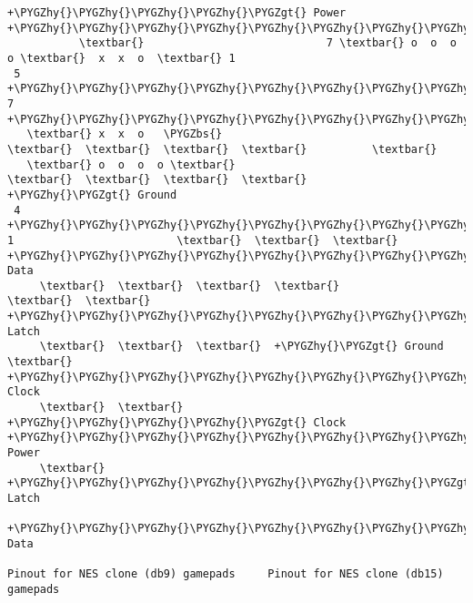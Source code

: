 \documentclass[a4paper,8pt,english]{sphinxmanual}
\def\PYGZbs{\char`\\}
\def\PYGZgt{\char`\>}
\def\PYGZhy{\char`\-}
\begin{document}
\begin{Verbatim}[commandchars=\\\{\}]
           +\PYGZhy{}\PYGZhy{}\PYGZhy{}\PYGZhy{}\PYGZgt{} Power                   +\PYGZhy{}\PYGZhy{}\PYGZhy{}\PYGZhy{}\PYGZhy{}\PYGZhy{}\PYGZhy{}\PYGZhy{}\PYGZhy{}\PYGZhy{}\PYGZhy{}\PYGZhy{}\PYGZhy{}\PYGZhy{}\PYGZhy{}\PYGZhy{}\PYGZhy{}\PYGZhy{}\PYGZhy{}\PYGZhy{}\PYGZhy{}\PYGZhy{}\PYGZhy{}\PYGZbs{}
           \textbar{}                            7 \textbar{} o  o  o  o \textbar{}  x  x  o  \textbar{} 1
 5 +\PYGZhy{}\PYGZhy{}\PYGZhy{}\PYGZhy{}\PYGZhy{}\PYGZhy{}\PYGZhy{}\PYGZhy{}\PYGZhy{}+  7                         +\PYGZhy{}\PYGZhy{}\PYGZhy{}\PYGZhy{}\PYGZhy{}\PYGZhy{}\PYGZhy{}\PYGZhy{}\PYGZhy{}\PYGZhy{}\PYGZhy{}\PYGZhy{}\PYGZhy{}\PYGZhy{}\PYGZhy{}\PYGZhy{}\PYGZhy{}\PYGZhy{}\PYGZhy{}\PYGZhy{}\PYGZhy{}\PYGZhy{}\PYGZhy{}/
   \textbar{} x  x  o   \PYGZbs{}                            \textbar{}  \textbar{}  \textbar{}  \textbar{}          \textbar{}
   \textbar{} o  o  o  o \textbar{}                           \textbar{}  \textbar{}  \textbar{}  \textbar{}          +\PYGZhy{}\PYGZgt{} Ground
 4 +\PYGZhy{}\PYGZhy{}\PYGZhy{}\PYGZhy{}\PYGZhy{}\PYGZhy{}\PYGZhy{}\PYGZhy{}\PYGZhy{}\PYGZhy{}\PYGZhy{}\PYGZhy{}+ 1                         \textbar{}  \textbar{}  \textbar{}  +\PYGZhy{}\PYGZhy{}\PYGZhy{}\PYGZhy{}\PYGZhy{}\PYGZhy{}\PYGZhy{}\PYGZhy{}\PYGZhy{}\PYGZhy{}\PYGZhy{}\PYGZhy{}\PYGZgt{} Data
     \textbar{}  \textbar{}  \textbar{}  \textbar{}                             \textbar{}  \textbar{}  +\PYGZhy{}\PYGZhy{}\PYGZhy{}\PYGZhy{}\PYGZhy{}\PYGZhy{}\PYGZhy{}\PYGZhy{}\PYGZhy{}\PYGZhy{}\PYGZhy{}\PYGZhy{}\PYGZhy{}\PYGZhy{}\PYGZhy{}\PYGZgt{} Latch
     \textbar{}  \textbar{}  \textbar{}  +\PYGZhy{}\PYGZgt{} Ground                    \textbar{}  +\PYGZhy{}\PYGZhy{}\PYGZhy{}\PYGZhy{}\PYGZhy{}\PYGZhy{}\PYGZhy{}\PYGZhy{}\PYGZhy{}\PYGZhy{}\PYGZhy{}\PYGZhy{}\PYGZhy{}\PYGZhy{}\PYGZhy{}\PYGZhy{}\PYGZhy{}\PYGZhy{}\PYGZgt{} Clock
     \textbar{}  \textbar{}  +\PYGZhy{}\PYGZhy{}\PYGZhy{}\PYGZhy{}\PYGZgt{} Clock                     +\PYGZhy{}\PYGZhy{}\PYGZhy{}\PYGZhy{}\PYGZhy{}\PYGZhy{}\PYGZhy{}\PYGZhy{}\PYGZhy{}\PYGZhy{}\PYGZhy{}\PYGZhy{}\PYGZhy{}\PYGZhy{}\PYGZhy{}\PYGZhy{}\PYGZhy{}\PYGZhy{}\PYGZhy{}\PYGZhy{}\PYGZhy{}\PYGZgt{} Power
     \textbar{}  +\PYGZhy{}\PYGZhy{}\PYGZhy{}\PYGZhy{}\PYGZhy{}\PYGZhy{}\PYGZhy{}\PYGZgt{} Latch
     +\PYGZhy{}\PYGZhy{}\PYGZhy{}\PYGZhy{}\PYGZhy{}\PYGZhy{}\PYGZhy{}\PYGZhy{}\PYGZhy{}\PYGZhy{}\PYGZgt{} Data

Pinout for NES clone (db9) gamepads     Pinout for NES clone (db15) gamepads


\end{Verbatim}
\end{document}
